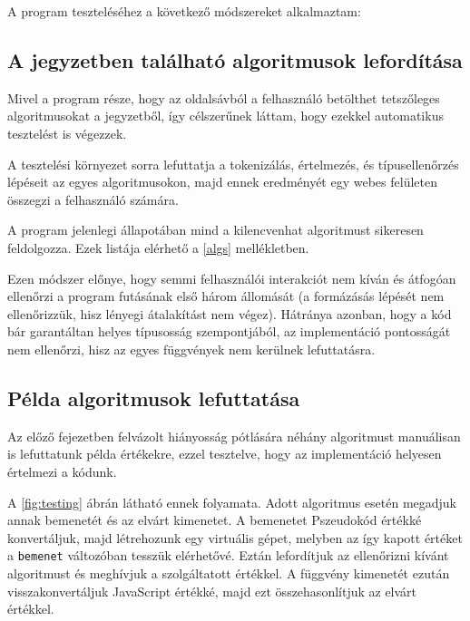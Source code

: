 A program teszteléséhez a következő módszereket alkalmaztam:

\subsection{A jegyzetben található algoritmusok lefordítása}

Mivel a program része, hogy az oldalsávból a felhasználó betölthet tetszőleges algoritmusokat a jegyzetből, így célszerűnek láttam, hogy ezekkel automatikus tesztelést is végezzek.

A tesztelési környezet sorra lefuttatja a tokenizálás, értelmezés, és típusellenőrzés lépéseit az egyes algoritmusokon, majd ennek eredményét egy webes felületen összegzi a felhasználó számára.

A program jelenlegi állapotában mind a kilencvenhat algoritmust sikeresen feldolgozza. Ezek listája elérhető a \ref{algs} mellékletben.

Ezen módszer előnye, hogy semmi felhasználói interakciót nem kíván és átfogóan ellenőrzi a program futásának első három állomását (a formázásás lépését nem ellenőrizzük, hisz lényegi átalakítást nem végez). Hátránya azonban, hogy a kód bár garantáltan helyes típusosság szempontjából, az implementáció pontosságát nem ellenőrzi, hisz az egyes függvények nem kerülnek lefuttatásra.

\subsection{Példa algoritmusok lefuttatása}

Az előző fejezetben felvázolt hiányosság pótlására néhány algoritmust manuálisan is lefuttatunk példa értékekre, ezzel tesztelve, hogy az implementáció helyesen értelmezi a kódunk.


A \ref{fig:testing} ábrán látható ennek folyamata. Adott algoritmus esetén megadjuk annak bemenetét és az elvárt kimenetet. A bemenetet Pszeudokód értékké konvertáljuk, majd létrehozunk egy virtuális gépet, melyben az így kapott értéket a \texttt{bemenet} változóban tesszük elérhetővé. Eztán lefordítjuk az ellenőrizni kívánt algoritmust és meghívjuk a szolgáltatott értékkel. A függvény kimenetét ezután visszakonvertáljuk JavaScript értékké, majd ezt összehasonlítjuk az elvárt értékkel.

